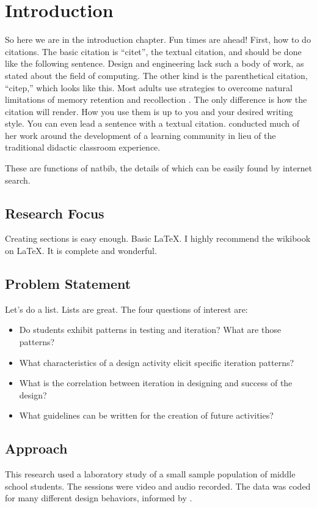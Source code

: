 \chapter{Introduction}

So here we are in the introduction chapter. Fun times are ahead! First, how to do citations. The basic citation is ``citet'', the textual citation, and should be done like the following sentence. Design and engineering lack such a body of work, as \citet[p. 35]{csed-guzdial} stated about the field of computing. The other kind is the parenthetical citation, ``citep,'' which looks like this. Most adults use strategies to overcome natural limitations of memory retention and recollection \citep{brown-1992}. The only difference is how the citation will render. How you use them is up to you and your desired writing style. You can even lead a sentence with a textual citation. \citet{brown-1992} conducted much of her work around the development of a learning community in lieu of the traditional didactic classroom experience. 

These are functions of natbib, the details of which can be easily found by internet search.

\section{Research Focus}
Creating sections is easy enough. Basic LaTeX. I highly recommend the wikibook on LaTeX. It is complete and wonderful. 
 
\section{Problem Statement}
Let's do a list. Lists are great. The four questions of interest are:
\begin{itemize}
\item Do students exhibit patterns in testing and iteration? What are those patterns?
\item What characteristics of a design activity elicit specific iteration patterns?
\item What is the correlation between iteration in designing and success of the design?
\item What guidelines can be written for the creation of future activities?
\end{itemize}


\section{Approach}
This research used a laboratory study of a small sample population of middle school students. The sessions were video and audio recorded. The data was coded for many different design behaviors, informed by \citep{welch}. 

